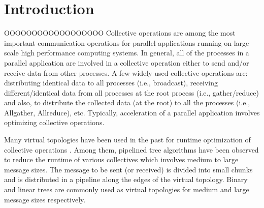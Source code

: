 \documentclass[sigplan,review,anonymous]{acmart}\settopmatter{printfolios=true,printccs=false,printacmref=false}
\begin{document}
\maketitle


\section{Introduction}
OOOOOOOOOOOOOOOOOO
Collective operations are among the most important communication operations for parallel applications running on large scale high performance computing systems. In general, all of the processes in a parallel application are involved in a collective operation either to send and/or receive data from other processes. A few widely used collective operations are: distributing identical data to all processes (i.e., broadcast), receiving different/identical data from all processes at the root process (i.e., gather/reduce) and also, to distribute the collected data (at the root) to all the processes (i.e., Allgather, Allreduce), etc.  Typically, acceleration of a parallel application involves optimizing collective operations.

Many virtual topologies have been used in the past for runtime optimization of collective operations \cite{hoefler-moor-collectives}. Among them, pipelined tree algorithms have been observed to reduce the runtime of various collectives which involves medium to large message sizes. The message to be sent (or received) is divided into small chunks and is distributed in a pipeline along the edges of the virtual topology.  Binary and linear trees are commonly used as virtual topologies for medium and large message sizes respectively. 
\end{document}
